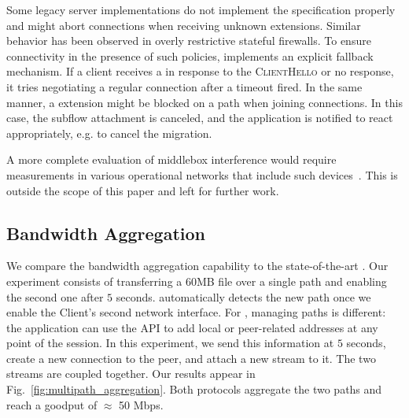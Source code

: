 Some legacy \tls server implementations do not implement the \tls
specification properly and might abort connections when receiving unknown \tls
extensions. Similar behavior has been observed in overly restrictive stateful
firewalls. To ensure connectivity in the presence of such policies, \tcpls
implements an explicit fallback mechanism. If a client receives a \tcp \rst in
response to the \tcpls \textsc{ClientHello} or no response, it
tries negotiating a regular \tls connection after a timeout fired. 
In the same manner, a \join extension might be
blocked on a path when joining connections. In this case, the subflow 
attachment is canceled, and
the application is notified to react appropriately, e.g. to cancel the 
migration.

A more complete evaluation of middlebox interference would require measurements 
in various operational networks that include such 
devices~\cite{honda2011still,raman2020measuring,o2016tls}. This is
outside the scope of this paper and left for further work. 



\subsection{Bandwidth Aggregation}
\label{sec:bwaggr}
We compare the \tcpls bandwidth aggregation capability to the state-of-the-art
\mptcp. 
Our experiment consists of transferring a 60MB file over a single path
and enabling the second one after $5$ seconds. \mptcp automatically detects
the new path once we enable the Client's second network interface. For \tcpls,
managing paths is different: the application can use the API to add local or
peer-related addresses at any point of the session. In this experiment, we send
this information at $5$ seconds, create a new \tcp connection to the peer, and
attach a new stream to it. The two streams are coupled together. Our results 
appear in Fig.~\ref{fig:multipath_aggregation}. Both protocols aggregate the 
two paths and reach a goodput of $\approx$ 50 Mbps. 

